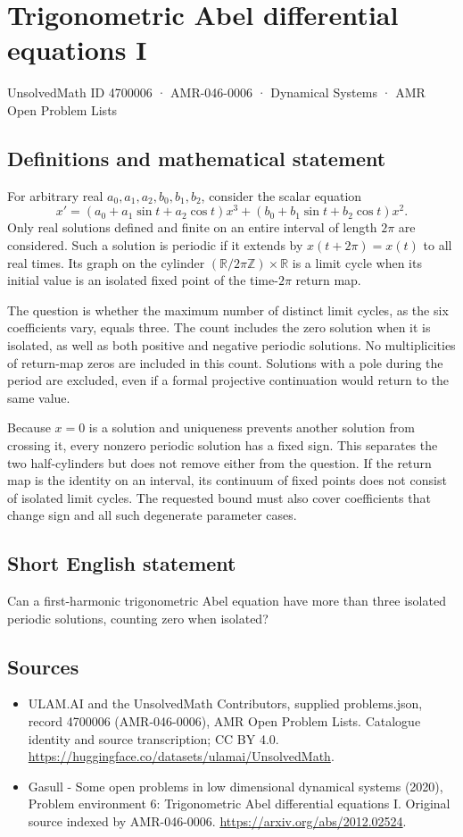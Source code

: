 \documentclass[11pt,a4paper]{article}
\begin{document}
\section*{Trigonometric Abel differential equations I}\label{4700006}
{\small UnsolvedMath ID 4700006 · AMR-046-0006 · Dynamical Systems · AMR Open Problem Lists}
\subsection{Definitions and mathematical statement}
For arbitrary real $a_0,a_1,a_2,b_0,b_1,b_2$, consider the scalar equation
\[
 x'=(a_0+a_1\sin t+a_2\cos t)x^3
       +(b_0+b_1\sin t+b_2\cos t)x^2.
\]
Only real solutions defined and finite on an entire interval of length
$2\pi$ are considered. Such a solution is periodic if it extends by
$x(t+2\pi)=x(t)$ to all real times. Its graph on the cylinder
$(\mathbb R/2\pi\mathbb Z)\times\mathbb R$ is a limit cycle when its initial
value is an isolated fixed point of the time-$2\pi$ return map.

The question is whether the maximum number of distinct limit cycles, as the
six coefficients vary, equals three. The count includes the zero solution
when it is isolated, as well as both positive and negative periodic
solutions. No multiplicities of return-map zeros are included in this count.
Solutions with a pole during the period are excluded, even if a formal
projective continuation would return to the same value.

Because $x=0$ is a solution and uniqueness prevents another solution from
crossing it, every nonzero periodic solution has a fixed sign. This separates
the two half-cylinders but does not remove either from the question. If the
return map is the identity on an interval, its continuum of fixed points
does not consist of isolated limit cycles. The requested bound must also
cover coefficients that change sign and all such degenerate parameter cases.
\subsection{Short English statement}
Can a first-harmonic trigonometric Abel equation have more than three isolated periodic solutions, counting zero when isolated?
\subsection{Sources}
\begin{itemize}
\item[S1] ULAM.AI and the UnsolvedMath Contributors, supplied problems.json, record 4700006 (AMR-046-0006), AMR Open Problem Lists. Catalogue identity and source transcription; CC BY 4.0.
\url{https://huggingface.co/datasets/ulamai/UnsolvedMath}.
\item[S2] Gasull - Some open problems in low dimensional dynamical systems (2020), Problem environment 6: Trigonometric Abel differential equations I. Original source indexed by AMR-046-0006.
\url{https://arxiv.org/abs/2012.02524}.
\end{itemize}
\end{document}
